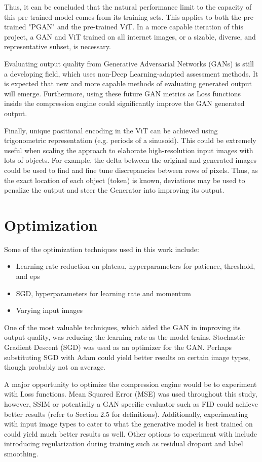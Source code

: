 Thus, it can be concluded that the natural performance limit to the capacity of this pre-trained model comes from its training sets.
This applies to both the pre-trained "PGAN" and the pre-trained ViT. 
In a more capable iteration of this project, a GAN and ViT trained on all internet images, or a sizable, diverse, and 
representative subset, is necessary. 


Evaluating output quality from Generative Adversarial Networks (GANs) is 
still a developing field, which uses non-Deep Learning-adapted assessment methods. 
It is expected that new and more capable methods of evaluating generated output will emerge.
Furthermore, using these future GAN metrics as Loss functions inside the compression engine could 
significantly improve the GAN generated output.


Finally, unique positional encoding in the ViT can be achieved using trigonometric representation (e.g. periods of a sinusoid).
This could be extremely useful when scaling the approach to elaborate high-resolution input images with lots of objects. 
For example, the delta between the original and generated images could be used to find and fine tune 
discrepancies between rows of pixels. Thus, as the exact location of each object (token) is known, deviations may 
be used to penalize the output and steer the Generator into improving its output. \citep{dosovitskiy2020vit}


\section{Optimization} 

Some of the optimization techniques used in this work include:
\begin{itemize}
    \item Learning rate reduction on plateau, hyperparameters for patience, threshold, and eps
    \item SGD, hyperparameters for learning rate and momentum 
	\item Varying input images 
\end{itemize} 

One of the most valuable techniques, which aided the GAN in improving its output quality, was
reducing the learning rate as the model trains. Stochastic Gradient Descent (SGD) was used as an optimizer for the GAN.
Perhaps substituting SGD with Adam could yield better results on certain image types, though probably
not on average.


A major opportunity to optimize the compression engine would be to experiment with Loss functions.
Mean Squared Error (MSE) was used throughout this study, however, SSIM or potentially a GAN specific evaluator such as FID
could achieve better results (refer to Section 2.5 for definitions).
Additionally, experimenting with input image types to cater to what the generative model is best trained on
could yield much better results as well.
Other options to experiment with include introducing regularization during training such as residual dropout and label smoothing.


